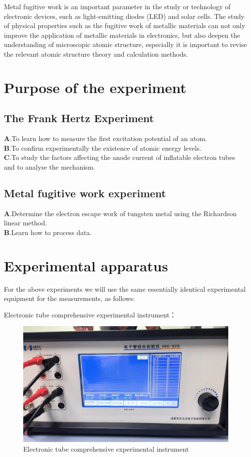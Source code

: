 \documentclass[UTF8]{article}
\begin{document}
Metal fugitive work is an important parameter in the study or technology of electronic devices, such as light-emitting diodes (LED) and solar cells. The study of physical properties such as the fugitive work of metallic materials can not only improve the application of metallic materials in electronics, but also deepen the understanding of microscopic atomic structure, especially it is important to revise the relevant atomic structure theory and calculation methods.
	
\section{Purpose of the experiment}
	\subsection{The Frank Hertz Experiment}
   $\bm{A}$.To learn how to measure the first excitation potential of an atom.\\
   $\bm{B}$.To confirm experimentally the existence of atomic energy levels.\\
   $\bm{C}$.To study the factors affecting the anode current of inflatable electron tubes and to analyse the mechanism.
   
   \subsection{Metal fugitive work experiment}
      $\bm{A}$.Determine the electron escape work of tungsten metal using the Richardson linear method.\\
      $\bm{B}$.Learn how to process data.\\

	\section{Experimental apparatus}
	For the above experiments we will use the same essentially identical experimental equipment for the measurements, as follows:
	
	Electronic tube comprehensive experimental instrument：
		\begin{figure}[H]
	\centering
	\includegraphics[clip,scale=0.8,trim={0 0 0 0}]{fig/fig1.jpg}
    \caption{Electronic tube comprehensive experimental instrument}
    \label{figure.1}
        \end{figure} 
        
\end{document}
